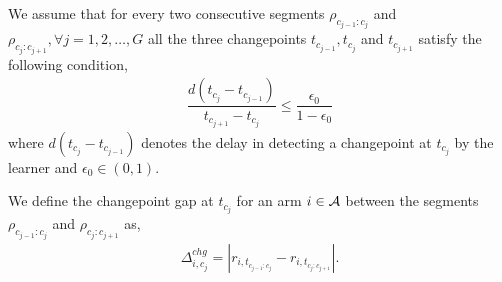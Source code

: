 



%
%
%

\begin{assumption}
\label{assm:space-gap}
We assume that for every two consecutive segments $\rho_{c_{j-1}:c_j}$ and $\rho_{c_j:c_{j+1}}, \forall j=1,2,\ldots,G$ all the three  changepoints $t_{c_{j-1}}, t_{c_j}$ and $t_{c_{j+1}}$ satisfy the following condition,
\begin{align*}
\dfrac{d(t_{c_j} - t_{c_{j-1}})}{t_{c_{j+1}} - t_{c_j}} \leq \dfrac{\epsilon_0}{1-\epsilon_0}
\end{align*}
where $d(t_{c_j} - t_{c_{j-1}})$ denotes the delay in detecting a changepoint at $t_{c_j}$ by the learner and $ \epsilon_0 \in (0,1)$.
\end{assumption}

\begin{definition}
\label{Def:chg-gap}
We define the changepoint gap at $t_{c_j}$ for an arm $i\in\mathcal{A}$ between the segments $\rho_{c_{j-1}:c_j}$ and $\rho_{c_j:c_{j+1}}$ as,
\begin{align*}
\Delta^{chg}_{i,c_j}=|r_{i,t_{c_{j-1}:c_j}}-r_{i,t_{c_j:c_{j+1}}}|.
\end{align*}
\end{definition}

